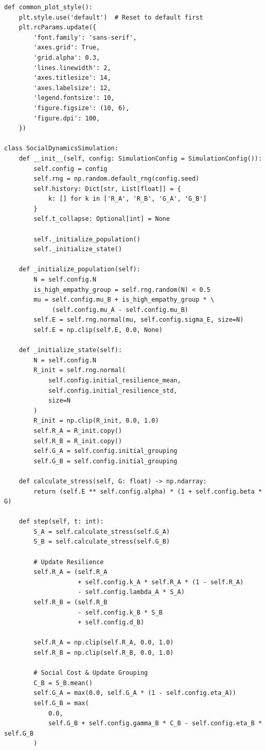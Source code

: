 \documentclass[11pt]{article}
\theoremstyle{plain}
\begin{document}
\begin{verbatim}
def common_plot_style():
    plt.style.use('default')  # Reset to default first
    plt.rcParams.update({
        'font.family': 'sans-serif',
        'axes.grid': True,
        'grid.alpha': 0.3,
        'lines.linewidth': 2,
        'axes.titlesize': 14,
        'axes.labelsize': 12,
        'legend.fontsize': 10,
        'figure.figsize': (10, 6),
        'figure.dpi': 100,
    })

class SocialDynamicsSimulation:
    def __init__(self, config: SimulationConfig = SimulationConfig()):
        self.config = config
        self.rng = np.random.default_rng(config.seed)
        self.history: Dict[str, List[float]] = {
            k: [] for k in ['R_A', 'R_B', 'G_A', 'G_B']
        }
        self.t_collapse: Optional[int] = None
        
        self._initialize_population()
        self._initialize_state()

    def _initialize_population(self):
        N = self.config.N
        is_high_empathy_group = self.rng.random(N) < 0.5
        mu = self.config.mu_B + is_high_empathy_group * \
             (self.config.mu_A - self.config.mu_B)
        self.E = self.rng.normal(mu, self.config.sigma_E, size=N)
        self.E = np.clip(self.E, 0.0, None)

    def _initialize_state(self):
        N = self.config.N
        R_init = self.rng.normal(
            self.config.initial_resilience_mean, 
            self.config.initial_resilience_std, 
            size=N
        )
        R_init = np.clip(R_init, 0.0, 1.0)
        self.R_A = R_init.copy()
        self.R_B = R_init.copy()
        self.G_A = self.config.initial_grouping
        self.G_B = self.config.initial_grouping

    def calculate_stress(self, G: float) -> np.ndarray:
        return (self.E ** self.config.alpha) * (1 + self.config.beta * G)

    def step(self, t: int):
        S_A = self.calculate_stress(self.G_A)
        S_B = self.calculate_stress(self.G_B)

        # Update Resilience
        self.R_A = (self.R_A
                    + self.config.k_A * self.R_A * (1 - self.R_A)
                    - self.config.lambda_A * S_A)
        self.R_B = (self.R_B
                    - self.config.k_B * S_B
                    + self.config.d_B)
        
        self.R_A = np.clip(self.R_A, 0.0, 1.0)
        self.R_B = np.clip(self.R_B, 0.0, 1.0)

        # Social Cost & Update Grouping
        C_B = S_B.mean()
        self.G_A = max(0.0, self.G_A * (1 - self.config.eta_A))
        self.G_B = max(
            0.0, 
            self.G_B + self.config.gamma_B * C_B - self.config.eta_B * self.G_B
        )


\end{verbatim}
\end{document}
